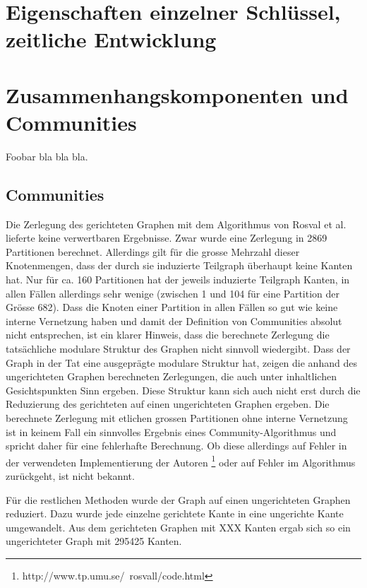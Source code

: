\section{Eigenschaften einzelner Schl\"ussel, zeitliche Entwicklung}
\label{sec:result-key-properties}

\section{Zusammenhangskomponenten und Communities}
\label{sec:result-zusamm-und-comm}




Foobar bla bla bla.

\subsection{Communities}
\label{sec:result-communities}

Die Zerlegung des gerichteten Graphen mit dem Algorithmus von Rosval
et al. lieferte keine verwertbaren Ergebnisse. Zwar wurde eine
Zerlegung in 2869 Partitionen berechnet. Allerdings gilt f\"ur die
grosse Mehrzahl dieser Knotenmengen, dass der durch sie induzierte
Teilgraph \"uberhaupt keine Kanten hat. Nur f\"ur ca. 160 Partitionen
hat der jeweils induzierte Teilgraph Kanten, in allen F\"allen
allerdings sehr wenige (zwischen 1 und 104 f\"ur eine Partition der
Gr\"osse 682). Dass die Knoten einer Partition in allen F\"allen so
gut wie keine interne Vernetzung haben und damit der Definition von
Communities absolut nicht entsprechen, ist ein klarer Hinweis, dass
die berechnete Zerlegung die tats\"achliche modulare Struktur des
Graphen nicht sinnvoll wiedergibt. Dass der Graph in der Tat eine
ausgepr\"agte modulare Struktur hat, zeigen die anhand des
ungerichteten Graphen berechneten Zerlegungen, die auch unter
inhaltlichen Gesichtspunkten Sinn ergeben. Diese Struktur kann sich
auch nicht erst durch die Reduzierung des gerichteten auf einen
ungerichteten Graphen ergeben. Die berechnete Zerlegung mit etlichen
grossen Partitionen ohne interne Vernetzung ist in keinem Fall ein
sinnvolles Ergebnis eines Community-Algorithmus und spricht daher
f\"ur eine fehlerhafte Berechnung. Ob diese allerdings auf Fehler in
der verwendeten Implementierung der Autoren
\footnote{http://www.tp.umu.se/~rosvall/code.html} oder auf Fehler im
Algorithmus zur\"uckgeht, ist nicht bekannt.

F\"ur die restlichen Methoden wurde der Graph auf einen ungerichteten
Graphen reduziert. Dazu wurde jede einzelne gerichtete Kante in eine
ungerichte Kante umgewandelt. Aus dem gerichteten Graphen mit XXX
Kanten ergab sich so ein ungerichteter Graph mit 295425 Kanten.

